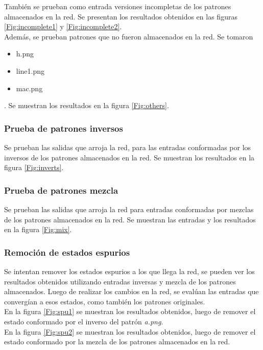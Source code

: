 \documentclass{article}
\begin{document}
También se prueban como entrada versiones incompletas de los patrones almacenados en la red. Se presentan los resultados obtenidos
en las figuras \ref{Fig:incomplete1} y \ref{Fig:incomplete2}.\\

Además, se prueban patrones que no fueron almacenados en la red. Se tomaron
\begin{itemize}
 \item h.png
 \item line1.png
 \item mac.png
\end{itemize}.
Se muestran los resultados en la figura \ref{Fig:others}.

\subsubsection{Prueba de patrones inversos}
Se prueban las salidas que arroja la red, para las entradas conformadas por los inversos de los patrones almacenados
en la red. Se muestran los resultados en la figura \ref{Fig:inverts}.

\subsubsection{Prueba de patrones mezcla}
Se prueban las salidas que arroja la red para entradas conformadas por mezclas de los patrones almacenados en la red.
Se muestran las entradas y los resultados en la figura \ref{Fig:mix}.

\subsubsection{Remoción de estados espurios}
Se intentan remover los estados espurios a los que llega la red, se pueden ver los resultados obtenidos
utilizando entradas inversas y mezcla de los patrones almacenados.
Luego de realizar los cambios en la red, se evalúan las entradas que convergían a esos estados, como también
los patrones originales.\\

En la figura \ref{Fig:spu1} se muestran los resultados obtenidos, luego de remover el estado conformado por 
el inverso del patrón \emph{a.png}.\\

En la figura \ref{Fig:spu2} se muestran los resultados obtenidos, luego de remover el estado conformado por la
mezcla de los patrones almacenados en la red.\\
\end{document}
